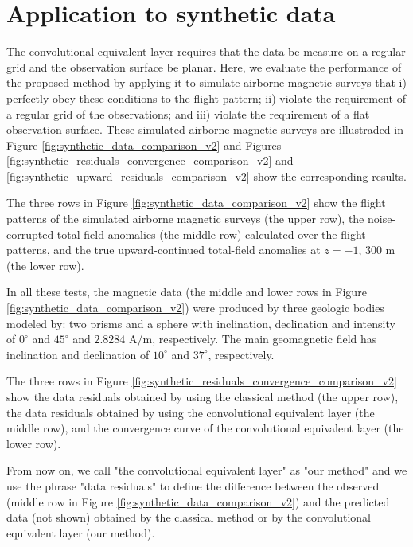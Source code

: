 \section{Application to synthetic data}

The convolutional equivalent layer requires that the data be measure on a regular grid and the observation surface be planar.
Here, we evaluate the performance of the proposed method by applying it to simulate airborne magnetic surveys 
that i) perfectly obey these conditions to the flight pattern; ii) violate the requirement of a regular grid of the observations; and iii) violate the requirement of a flat observation surface.
These simulated airborne magnetic surveys are illustraded in Figure \ref{fig:synthetic_data_comparison_v2} 
and Figures  \ref{fig:synthetic_residuals_convergence_comparison_v2} and  \ref{fig:synthetic_upward_residuals_comparison_v2} show the corresponding results.

The  three rows in Figure \ref{fig:synthetic_data_comparison_v2} show the flight patterns of the simulated airborne magnetic surveys (the upper row), the noise-corrupted total-field anomalies (the middle row) calculated over the flight patterns, and the true upward-continued total-field anomalies at $z = -1, \, 300$ m (the lower row).

In all these tests, the magnetic data (the middle and lower rows in Figure \ref{fig:synthetic_data_comparison_v2})  were produced by three geologic bodies modeled by: two prisms and a sphere with inclination, declination and intensity of $0^{\circ}$ and $45^{\circ}$ and $2.8284$ A/m, respectively. The main geomagnetic field has inclination and declination of $10^{\circ}$ and $37^{\circ}$, respectively. 

The  three rows in Figure \ref{fig:synthetic_residuals_convergence_comparison_v2}  show the data residuals 
obtained by using the classical method (the upper row), the data residuals obtained by using the
convolutional equivalent layer (the middle row), and the convergence curve of the convolutional equivalent layer (the lower row).

From now on, we call "the convolutional equivalent layer" as "our method" and we use the phrase "data residuals" to define the difference between the observed (middle row in Figure \ref{fig:synthetic_data_comparison_v2}) and the predicted data (not shown) obtained by the classical method or by the convolutional equivalent layer (our method). 


